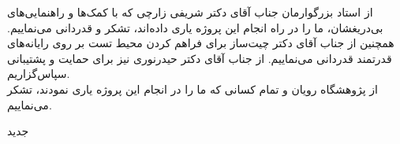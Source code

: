 


\begin{center}
\end{center}

از استاد بزرگوارمان جناب آقای دکتر شریفی زارچی که با کمک‌ها و راهنمایی‌های بی‌دریغشان، ما را در راه انجام این پروژه یاری داده‌اند، تشکر و قدردانی می‌نماییم. همچنین از جناب آقای دکتر چیت‌ساز برای فراهم کردن محیط تست بر روی رایانه‌های قدرتمند قدردانی می‌نماییم. از جناب آقای دکتر حیدرنوری نیز برای حمایت و پشتیبانی سپاس‌گزاریم.
\\
از پژوهشگاه رویان و تمام کسانی که ما را در انجام این پروژه یاری نمودند، تشکر می‌نماییم.

‌جدید
